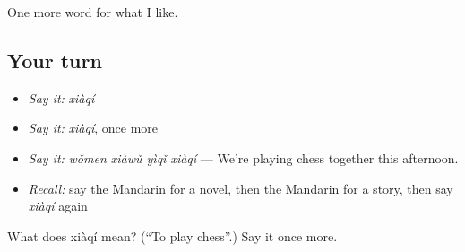 \begin{grammarlens}[title={What you've built}]
One more word for what I like.
\end{grammarlens}

\subsection*{Your turn}
\begin{itemize}
\raggedright
  \item \emph{Say it:} \emph{xiàqí}
  \item \emph{Say it:} \emph{xiàqí}, once more
  \item \emph{Say it:} \emph{wǒmen xiàwǔ yìqǐ xiàqí} — We're playing chess together this afternoon.
  \item \emph{Recall:} say the Mandarin for a novel, then the Mandarin for a story, then say \emph{xiàqí} again
\end{itemize}

\begin{tcolorbox}[breakable,colback=teal!4,colframe=teal!35!black,title={Before you move on}]
What does xiàqí mean? (\textquotedblleft{}To play chess\textquotedblright{}.) Say it once more.
\end{tcolorbox}
